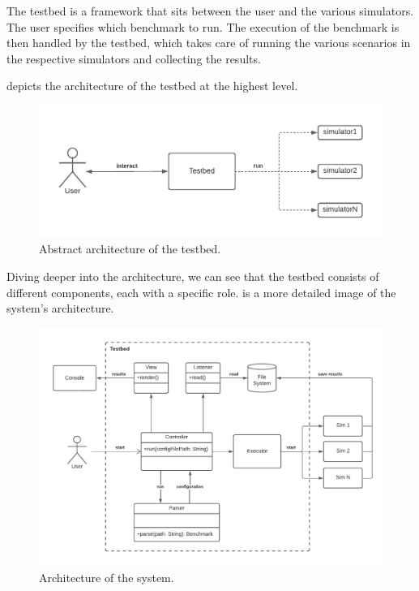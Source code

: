 \documentclass[12pt,a4paper,openright,twoside]{book}
\begin{document}
The testbed is a framework that sits between the user and the various simulators.
The user specifies which benchmark to run.
The execution of the benchmark is then handled by the testbed, which takes care of running the various scenarios in the respective simulators and collecting the results.

 depicts the architecture of the testbed at the highest level.

\begin{figure}[h!]
  \centering
  \includegraphics[width=\textwidth]{figures/architecture-high-level.pdf}
  \caption{Abstract architecture of the testbed.}
  \label{fig:high-level-architecture}
\end{figure}

Diving deeper into the architecture, we can see that the testbed consists of different components, each with a specific role.
 is a more detailed image of the system's architecture.

\begin{figure}[h!]
  \centering
  \includegraphics[width=\textwidth]{figures/testbed-architecture.pdf}
  \caption{Architecture of the system.}
  \label{fig:detailed-architecture}
\end{figure}
\end{document}
